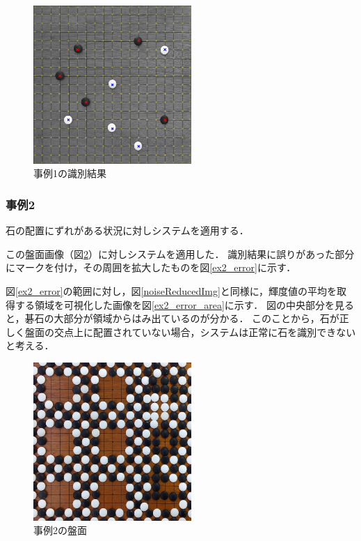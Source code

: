 \documentclass[openright]{nitocs}
\numberwithin{equation}{section}
\begin{document}
                \begin{figure}[tb] %
                    \begin{center}
                    \includegraphics[clip,width=60mm]{DSC_0041/result.jpg} 
                    \caption{事例1の識別結果}
                    \label{ex1_result}
                    \end{center}
                \end{figure}

            \subsubsection{事例2} %
                石の配置にずれがある状況に対しシステムを適用する．

                この盤面画像（図\ref{ex2}）に対しシステムを適用した．
                識別結果に誤りがあった部分にマークを付け，その周囲を拡大したものを図\ref{ex2_error}に示す．

                図\ref{ex2_error}の範囲に対し，図\ref{noiseReducedImg}と同様に，輝度値の平均を取得する領域を可視化した画像を図\ref{ex2_error_area}に示す．
                図の中央部分を見ると，碁石の大部分が領域からはみ出ているのが分かる．
                このことから，石が正しく盤面の交点上に配置されていない場合，システムは正常に石を識別できないと考える．
                
                
                \begin{figure}[tb] %
                    \begin{center}
                    \includegraphics[clip,width=60mm]{DSC_0099/boardImg.jpg} 
                    \caption{事例2の盤面}
                    \label{ex2}
                    \end{center}
                \end{figure}
\end{document}
